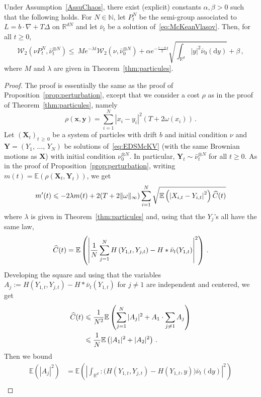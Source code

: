 \documentclass[AHL,Unicode,longabstracts,published]{cedram}
\newcommand{\R}{\mathbb R}
\newcommand{\bbE}{\mathbb E}
\newcommand{\clW}{\mathcal W}
\newcommand{\N}{\mathbb N}
\newcommand{\dd}{\mathrm{d}}
\newcommand{\na}{\nabla}
\newcommand{\1}{\mathbbm{1}}
\newcommand{\bx}{\mathbf{x}}
\newcommand{\by}{\mathbf{y}}
\newcommand{\bX}{\mathbf{X}}
\newcommand{\bY}{\mathbf{Y}}
\newcommand{\nv}[1]{#1}
\let\oldhat\hat
\renewcommand*{\hat}[1]{\mathchoice{\widehat{#1}}{\widehat{#1}}{\oldhat{#1}}{\oldhat{#1}}}
\newcommand{\R}{\mathbb R}
\newcommand{\clW}{\mathcal W}
\begin{document}
\begin{theo}\label{thm:champmoyen}
Under Assumption~\ref{AssuChaos}, there exist (explicit) constants $\alpha,\beta>0$ such that the following holds. For $N\in\N$, let $P_t^N$ be the semi-group associated to $L= b\cdot\na + T\Delta$ on $\R^{dN}$ and let $\bar \nu_t$ be a solution of~\eqref{eq:McKeanVlasov}. Then, for all $t\geqslant 0$,
\[
\clW_2 \left( \nu P_t^N, \bar \nu_t^{\otimes N}\right) \leqslant \ M e^{-\lambda t} \clW_2 \left( \nu, \bar \nu_0^{\otimes N}\right) + \alpha e^{-\frac{c-a}{2}t}\sqrt{\int_{\R^d} |y|^2 \bar \nu_0(\dd y)} + \beta \,,
\]
where $M$ and $\lambda$ are given in Theorem~\ref{thm:particules}.
\end{theo}
\begin{proof}
The proof is essentially the same as the proof of Proposition~\ref{prop:perturbation}, except that we consider a \nv{cost} $\rho$ as in the proof of Theorem~\ref{thm:particules}, namely
\[
\rho(\bx,\by) = \sum_{i=1}^N |x_i-y_i|^2 \left( T+2\nv{\omega}(x_i)\right) \,.
\]
Let $(\bX_t)_{t\,\geqslant\,0}$ be a system of particles with drift $b$ and initial condition $\nu$ and $\bY=(Y_1,\,\dots,\,Y_N)$ be solutions of~\eqref{eq:EDSMcKV} (with the same Brownian motions as $\bX$) with initial condition $ \nu_0^{\otimes N}$. In particular, $\bY_t \sim \nv{\bar \nu}_t^{\otimes N}$ for all $t\geqslant 0$. As in the proof of Proposition~\ref{prop:perturbation}, writing $m(t) = \bbE( \rho(\bX_t,\bY_t))$, we get
\begin{equation}\label{eq:demochaos}
m'(t) \leqslant -2\lambda m(t) + 2 (T+2\|\nv{\omega}\|_\infty) \sum_{i=1}^N \sqrt{ \bbE \left( \left|X_{i,t} - Y_{i,t}\right|^2\right) \hat C(t) }
\end{equation}
where $\lambda$ is given in Theorem~\ref{thm:particules} and, using that the $Y_j$'s all have the same law,
\[
\hat C(t) = \bbE\left( \left|\frac1N\sum_{j=1}^N H\left(Y_{1,t},Y_{j,t}\right) - H\ast \bar \nu_t(Y_{1,t})\right|^2\right)\,.
\]
Developing the square and using that the variables $A_j:= H(Y_{1,t},Y_{j,t}) - H\ast \bar \nu_t(Y_{1,t})$ for $j\neq 1$ are independent and centered, we get
\begin{align*}
\hat C(t)& \leqslant \frac1{N^2} \bbE \left( \sum_{j=1}^N |A_j|^2 + A_1\cdot \sum_{j\neq 1} A_j \right) \\
& \leqslant \frac1{N} \bbE \left( |A_1|^2 + |A_2|^2 \right)\,.
\end{align*}
Then we bound
\begin{align*}
\bbE \left( \left|A_j\right|^2 \right) &= \bbE\left( \left| \int_{\R^d} :\big(H\left(Y_{1,t},Y_{j,t}\right) - H\left(Y_{1,t},y\right)\big) \bar \nu_t(\dd y)\right|^2 \right) \\

\end{align*}
\end{proof}
\end{document}
